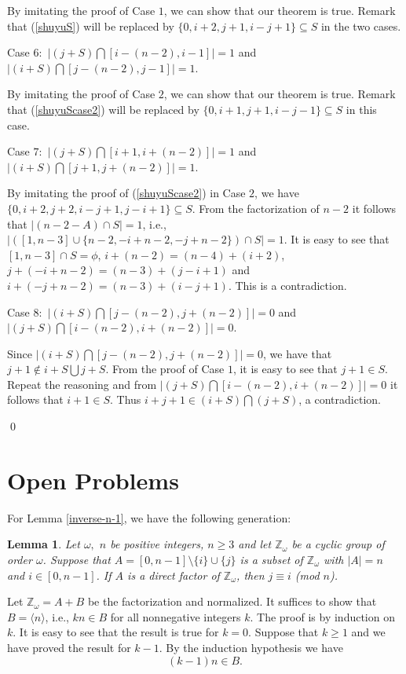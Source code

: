 \documentclass[preprint]{elsarticle}
\newtheorem{lem}[thm]{Lemma}
\begin{document}
By imitating the proof of Case $1$, we can show that our theorem is true.
Remark that (\ref{shuyuS}) will be replaced by $\{0,i+2,j+1,i-j+1\}\subseteq S$ in the two cases.

Case $6:$ $|(j+S)\bigcap [i-(n-2),i-1]|=1$ and $|(i+S)\bigcap [j-(n-2),j-1]|=1$.

By imitating the proof of Case $2$, we can show that our theorem is true.
Remark that (\ref{shuyuScase2}) will be replaced by $\{0,i+1,j+1,i-j-1\}\subseteq S$ in this case.

Case $7:$ $|(j+S)\bigcap [i+1,i+(n-2)]|=1$ and $|(i+S)\bigcap [j+1,j+(n-2)]|=1$.

By imitating the proof of (\ref{shuyuScase2}) in Case $2$, we have $\{0,i+2,j+2,i-j+1,j-i+1\}\subseteq S$.
From the factorization of $n-2$ it follows that $|(n-2-A)\cap S|=1$, i.e.,
$|([1,n-3]\cup \{n-2,-i+n-2,-j+n-2\})\cap S|=1$.
It is easy to see that $[1,n-3]\cap S=\phi$, $i+(n-2)=(n-4)+(i+2)$, $j+(-i+n-2)=(n-3)+(j-i+1)$ and $i+(-j+n-2)=(n-3)+(i-j+1)$.
This is a contradiction.

Case $8:$ $|(i+S)\bigcap [j-(n-2),j+(n-2)]|=0$ and $|(j+S)\bigcap [i-(n-2),i+(n-2)]|=0$.

Since $|(i+S)\bigcap [j-(n-2),j+(n-2)]|=0$,
we have that $j+1\not\in i+S\bigcup j+S$.
From the proof of Case $1$, it is easy to see that $j+1\in S$.
Repeat the reasoning and from $|(j+S)\bigcap [i-(n-2),i+(n-2)]|=0$ it follows that $i+1\in S$.
Thus $i+j+1\in (i+S)\bigcap(j+S)$, a contradiction.

\qed




\section{Open Problems}

For Lemma \ref{inverse-n-1}, we have the following generation:

\begin{lem} \label{inverse-n-1-genfac}
Let $\omega,$ $n$ be positive integers, $n\geq 3$ and let $\mathbb{Z}_{\omega}$ be a cyclic group of order $\omega$.
Suppose that $A=[0,n-1]\setminus \{i\}\cup \{j\}$ is a subset of $\mathbb{Z}_{\omega}$ with $|A|=n$ and $i\in [0,n-1]$.
If $A$ is a direct factor of $\mathbb{Z}_{\omega}$, then $j\equiv i$ (mod $n$).
\end{lem}

\pf
Let $\mathbb{Z}_{\omega}=A+B$ be the factorization and normalized.
It suffices to show that $B=\langle n\rangle$, i.e., $kn\in B$ for all nonnegative integers $k$.
The proof is by induction on $k$.
It is easy to see that the result is true for $k=0$.
Suppose that $k\geq 1$ and we have proved the result for $k-1$.
By the induction hypothesis we have $$(k-1)n\in B.$$
\end{document}
